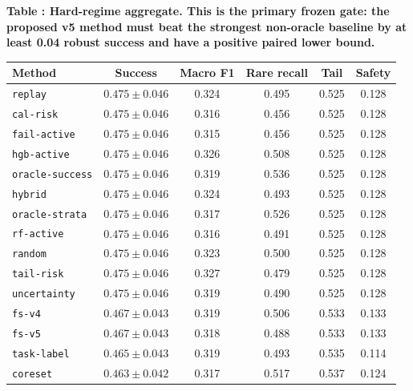 \documentclass{article}
\begin{document}
\scriptsize
\setlength{\tabcolsep}{2pt}
\begin{center}
\label{tab:hard}\textbf{Table \thetable: Hard-regime aggregate. This is the primary frozen gate: the proposed v5 method must beat the strongest non-oracle baseline by at least 0.04 robust success and have a positive paired lower bound.}\\[0.4ex]
\begin{tabular}{lccccc}
\toprule
Method & Success & Macro F1 & Rare recall & Tail & Safety \\
\midrule
\texttt{replay} & $0.475 \pm 0.046$ & 0.324 & 0.495 & 0.525 & 0.128 \\
\texttt{cal-risk} & $0.475 \pm 0.046$ & 0.316 & 0.456 & 0.525 & 0.128 \\
\texttt{fail-active} & $0.475 \pm 0.046$ & 0.315 & 0.456 & 0.525 & 0.128 \\
\texttt{hgb-active} & $0.475 \pm 0.046$ & 0.326 & 0.508 & 0.525 & 0.128 \\
\texttt{oracle-success} & $0.475 \pm 0.046$ & 0.319 & 0.536 & 0.525 & 0.128 \\
\texttt{hybrid} & $0.475 \pm 0.046$ & 0.324 & 0.493 & 0.525 & 0.128 \\
\texttt{oracle-strata} & $0.475 \pm 0.046$ & 0.317 & 0.526 & 0.525 & 0.128 \\
\texttt{rf-active} & $0.475 \pm 0.046$ & 0.316 & 0.491 & 0.525 & 0.128 \\
\texttt{random} & $0.475 \pm 0.046$ & 0.323 & 0.500 & 0.525 & 0.128 \\
\texttt{tail-risk} & $0.475 \pm 0.046$ & 0.327 & 0.479 & 0.525 & 0.128 \\
\texttt{uncertainty} & $0.475 \pm 0.046$ & 0.319 & 0.490 & 0.525 & 0.128 \\
\texttt{fs-v4} & $0.467 \pm 0.043$ & 0.319 & 0.506 & 0.533 & 0.133 \\
\texttt{fs-v5} & $0.467 \pm 0.043$ & 0.318 & 0.488 & 0.533 & 0.133 \\
\texttt{task-label} & $0.465 \pm 0.043$ & 0.319 & 0.493 & 0.535 & 0.114 \\
\texttt{coreset} & $0.463 \pm 0.042$ & 0.317 & 0.517 & 0.537 & 0.124 \\
\bottomrule
\end{tabular}
\end{center}
\normalsize
\end{document}
